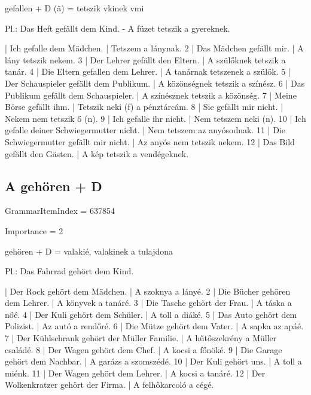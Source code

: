 \documentclass{article}
\newenvironment{desc}{\verbatim}{\endverbatim}
\newenvironment{exmp}{\verbatim}{\endverbatim}
\begin{document}
\begin{desc}
gefallen + D (ä) = tetszik vkinek vmi

Pl.: Das Heft gefällt dem Kind. - A füzet tetszik a gyereknek.
\end{desc}

\begin{exmp}
1 | Ich gefalle dem Mädchen. | Tetszem a lánynak.
2 | Das Mädchen gefällt mir. | A lány tetszik nekem.
3 | Der Lehrer gefällt den Eltern. | A szülőknek tetszik a tanár.
4 | Die Eltern gefallen dem Lehrer. | A tanárnak tetszenek a szülők.
5 | Der Schauspieler gefällt dem Publikum. | A közönségnek tetszik a színész.
6 | Das Publikum gefällt dem Schauspieler. | A színésznek tetszik a közönség.
7 | Meine Börse gefällt ihm. | Tetszik neki (f) a pénztárcám.
8 | Sie gefällt mir nicht. | Nekem nem tetszik ő (n).
9 | Ich gefalle ihr nicht. | Nem tetszem neki (n).
10 | Ich gefalle deiner Schwiegermutter nicht. | Nem tetszem az anyósodnak.
11 | Die Schwiegermutter gefällt mir nicht. | Az anyós nem tetszik nekem.
12 | Das Bild gefällt den Gästen. | A kép tetszik a vendégeknek.
\end{exmp}

\subsection{A gehören + D}

GrammarItemIndex = 637854

Importance = 2

\begin{desc}
gehören + D = valakié, valakinek a tulajdona

Pl.: Das Fahrrad gehört dem Kind.
\end{desc}

\begin{exmp}
1 | Der Rock gehört dem Mädchen. | A szoknya a lányé.
2 | Die Bücher gehören dem Lehrer. | A könyvek a tanáré.
3 | Die Tasche gehört der Frau. | A táska a nőé.
4 | Der Kuli gehört dem Schüler. | A toll a diáké.
5 | Das Auto gehört dem Polizist. | Az autó a rendőré.
6 | Die Mütze gehört dem Vater. | A sapka az apáé.
7 | Der Kühlschrank gehört der Müller Familie. | A hűtőszekrény a Müller családé.
8 | Der Wagen gehört dem Chef. | A kocsi a főnöké.
9 | Die Garage gehört dem Nachbar. | A garázs a szomszédé.
10 | Der Kuli gehört uns. | A toll a miénk.
11 | Der Wagen gehört dem Lehrer. | A kocsi a tanáré.
12 | Der Wolkenkratzer gehört der Firma. | A felhőkarcoló a cégé.
\end{exmp}
\end{document}
